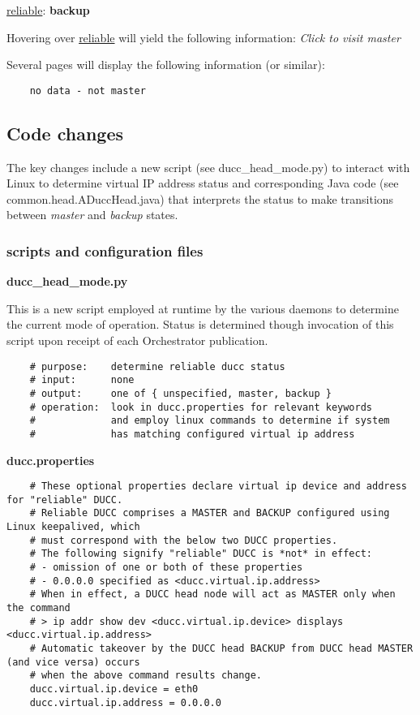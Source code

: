 \documentclass[letterpaper]{article}
\begin{document}
	\underline{reliable}: \textbf{backup}
   	
   	Hovering over \underline{reliable} will yield the following information:
   	{\em Click to visit master}
   	
   	Several pages will display the following information (or similar):
   	
   	\begin{verbatim}
	no data - not master
   	\end{verbatim}
	
\subsection{Code changes}

The key changes include a new script (see ducc\_head\_mode.py) to 
interact with Linux to determine virtual IP address status and 
corresponding Java code (see common.head.ADuccHead.java)
that interprets the status to make transitions between 
{\em master} and {\em backup} states.

\subsubsection{scripts and configuration files}

\textbf{ducc\_head\_mode.py}

This is a new script employed at runtime by the various daemons to
determine the current mode of operation.  Status is determined 
though invocation of this script upon receipt of each Orchestrator
publication.

   \begin{verbatim}
    # purpose:    determine reliable ducc status
    # input:      none
    # output:     one of { unspecified, master, backup }
    # operation:  look in ducc.properties for relevant keywords
    #             and employ linux commands to determine if system
    #             has matching configured virtual ip address
   \end{verbatim}
    
\textbf{ducc.properties}  

   \begin{verbatim}
    # These optional properties declare virtual ip device and address for "reliable" DUCC.
    # Reliable DUCC comprises a MASTER and BACKUP configured using Linux keepalived, which
    # must correspond with the below two DUCC properties.
    # The following signify "reliable" DUCC is *not* in effect:
    # - omission of one or both of these properties
    # - 0.0.0.0 specified as <ducc.virtual.ip.address>
    # When in effect, a DUCC head node will act as MASTER only when the command
    # > ip addr show dev <ducc.virtual.ip.device> displays <ducc.virtual.ip.address>
    # Automatic takeover by the DUCC head BACKUP from DUCC head MASTER (and vice versa) occurs 
    # when the above command results change.
    ducc.virtual.ip.device = eth0
    ducc.virtual.ip.address = 0.0.0.0
   \end{verbatim}
    
\end{document}
